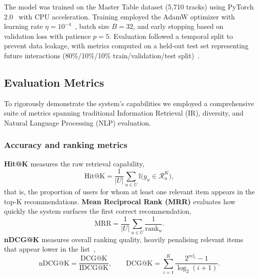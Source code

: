 \documentclass[]{ceurart}
\begin{document}
The model was trained on the Master Table dataset (5,710 tracks) using PyTorch
2.0~\cite{paszke2019pytorch} with CPU acceleration. Training employed the AdamW
optimizer with learning rate $\eta=10^{-4}$~\cite{loshchilov2019decoupled},
batch size $B=32$, and early stopping based on validation loss with patience
$p=5$. Evaluation followed a temporal split to prevent data leakage, with
metrics computed on a held-out test set representing future interactions
(80\%/10\%/10\% train/validation/test split)~\cite{bengio2004no}.

\subsection{Evaluation Metrics}
To rigorously demonstrate the system's capabilities we employed a comprehensive
suite of metrics spanning traditional Information Retrieval (IR), diversity,
and Natural Language Processing (NLP) evaluation.

\subsubsection{Accuracy and ranking metrics}
\textbf{Hit@K} measures the raw retrieval capability,
\begin{equation}
\text{Hit@K} = \frac{1}{|U|} \sum_{u \in U}
  \mathbb{I}\bigl(y_u \in \mathcal{R}_u^K\bigr),
\label{eq:hit}
\end{equation}
that is, the proportion of users for whom at least one relevant item appears in
the top-K recommendations. \textbf{Mean Reciprocal Rank (MRR)} evaluates how
quickly the system surfaces the first correct recommendation,
\begin{equation}
\text{MRR} = \frac{1}{|U|} \sum_{u \in U} \frac{1}{\text{rank}_u}.
\label{eq:mrr}
\end{equation}
\textbf{nDCG@K} measures overall ranking quality, heavily penalising relevant
items that appear lower in the list~\cite{jarvelin2002cumulated},
\begin{equation}
\text{nDCG@K} = \frac{\text{DCG@K}}{\text{IDCG@K}},
\qquad
\text{DCG@K} = \sum_{i=1}^{K} \frac{2^{rel_i} - 1}{\log_2(i+1)}.
\label{eq:ndcg}
\end{equation}
\end{document}
